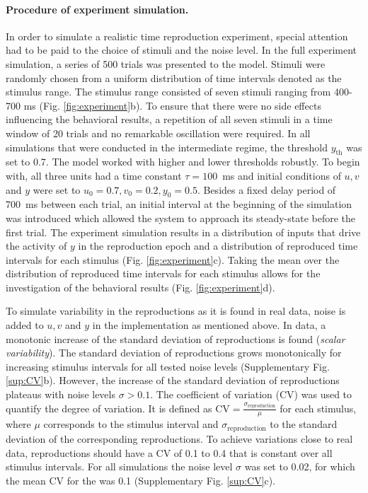 \documentclass[10pt]{article}
\begin{document}
\paragraph{Procedure of experiment simulation.}
In order to simulate a realistic time reproduction experiment, special attention had to be paid to the choice of stimuli and the noise level.  
In the full experiment simulation, a series of 500 trials was presented to the model.
Stimuli were randomly chosen from a uniform distribution of time intervals denoted as the stimulus range. 
The stimulus range consisted of seven stimuli ranging from 400-700 ms (Fig. \ref{fig:experiment}b).
To ensure that there were no side effects influencing the behavioral results, a repetition of all seven stimuli in a time window of 20 trials and no remarkable oscillation were required.
In all simulations that were conducted in the intermediate regime, the threshold $y_\text{th}$ was set to 0.7. The model worked with higher and lower thresholds robustly. 
To begin with, all three units had a time constant $\tau = 100$~ms and initial conditions of $u, v$ and $y$ were set to $u_0=0.7, v_0=0.2, y_0=0.5$.
Besides a fixed delay period of 700~ms between each trial, an initial interval at the beginning of the simulation was introduced which allowed the system to approach its steady-state before the first trial. 
The experiment simulation results in a distribution of inputs that drive the activity of $y$ in the reproduction epoch and a distribution of reproduced time intervals for each stimulus (Fig. \ref{fig:experiment}c).
Taking the mean over the distribution of reproduced time intervals for each stimulus allows for the investigation of the behavioral results (Fig. \ref{fig:experiment}d). 

To simulate variability in the reproductions as it is found in real data, noise is added to $u, v$ and $y$ in the implementation as mentioned above. In data, a monotonic increase of the standard deviation of reproductions is found (\textit{scalar variability}). 
The standard deviation of reproductions grows monotonically for increasing stimulus intervals for all tested noise levels (Supplementary Fig. \ref{sup:CV}b).
However, the increase of the standard deviation of reproductions plateaus with noise levels $\sigma > 0.1$.
The coefficient of variation (CV) was used to quantify the degree of variation. It is defined as $\text{CV}=\frac{\sigma_\text{reproduction}}{\mu}$ for each stimulus, where $\mu$ corresponds to the stimulus interval and $\sigma_\text{reproduction}$ to the standard deviation of the corresponding reproductions. 
To achieve variations close to real data, reproductions should have a CV of 0.1 to 0.4 that is constant over all stimulus intervals.
For all simulations the noise level $\sigma$ was set to 0.02, for which the mean CV for the was 0.1 (Supplementary Fig. \ref{sup:CV}c).
\end{document}
